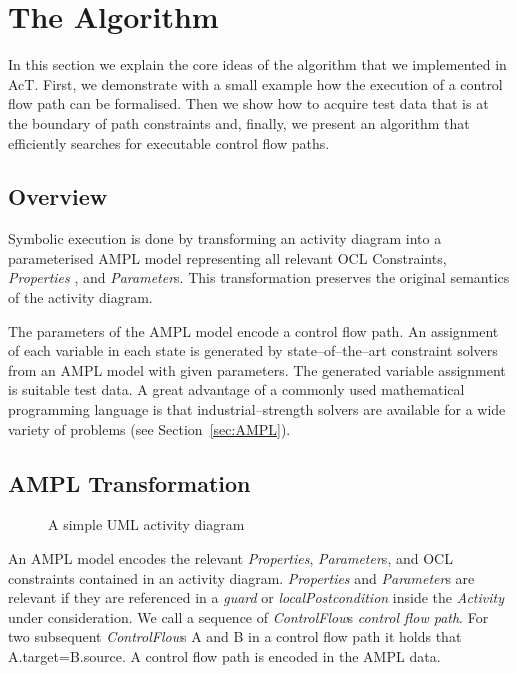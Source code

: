 \documentclass[runningheads,a4paper]{llncs}%
\newcommand{\UMLType}[1]{\textsf{\textit{#1}}} %
\newcommand{\UMLReference}[1]{\textsf{\textit{#1}}} %
\begin{document}
\section{The Algorithm}%
\label{sec:Algorithm}%
In this section we explain the core ideas of the algorithm that we implemented
in AcT. First, we demonstrate with a
small example how the execution of a control flow path can be formalised. Then
we show how to acquire test data that is at the boundary of path constraints
and, finally, we present an algorithm that efficiently searches for executable
control flow paths.%
%
\subsection{Overview}%
Symbolic execution is done by transforming an activity diagram into a
parameterised AMPL model representing all relevant OCL Constraints,
\UMLType{Properties} , and \UMLType{Parameter}s. This transformation preserves
the original semantics of the activity diagram.

The parameters of the AMPL model encode a control flow path. An assignment of
each variable in each state is generated by state--of--the--art constraint
solvers from an AMPL model with given parameters. The generated variable
assignment is suitable test data. A great advantage of a commonly used
mathematical programming language is that industrial--strength solvers are
available for a wide variety of problems (see Section~\ref{sec:AMPL}).
%
\subsection{AMPL Transformation}%
\label{sec:AMPLTransformation}%
\begin{figure}%
\def\svgwidth{\textwidth}%
\graphicspath{{./pics/}}%
%
\caption{A simple UML activity diagram}%
\label{fig:AssignmentDecision}%
\end{figure}%
An AMPL model encodes the relevant \UMLType{Properties}, \UMLType{Parameter}s,
and OCL constraints contained in an activity diagram. \UMLType{Properties} and
\UMLType{Parameter}s are relevant if they are referenced in a
\UMLReference{guard} or \UMLReference{localPostcondition} inside the
\UMLType{Activity} under consideration. We call a sequence of
\UMLReference{ControlFlow}s \emph{control flow path}. For two subsequent
\UMLType{ControlFlow}s A and B in a control flow path it holds that
A.target=B.source. A control flow path is encoded in the AMPL data.
\end{document}
